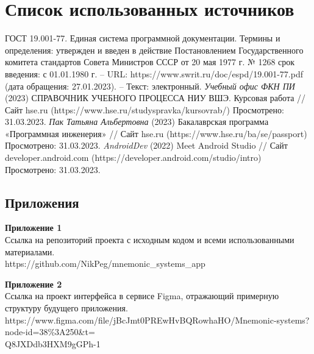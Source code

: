 \documentclass[draft]{article}
\newcommand\zz[1]{\par{\normalsize\strut #1} \hfill\ignorespaces}
\begin{document}
\section*{Список использованных источников}
\begin{thebibliography}{}
 ГОСТ 19.001-77. Единая система программной документации. Термины и определения: утвержден и введен в действие Постановлением Государственного комитета стандартов Совета Министров СССР от 20 мая 1977 г. № 1268 срок введения: с 01.01.1980 г. – URL: https://www.swrit.ru/doc/espd/19.001-77.pdf (дата обращения: 27.01.2023). – Текст: электронный.
 \textit{Учебный офис ФКН ПИ} (2023) СПРАВОЧНИК УЧЕБНОГО ПРОЦЕССА НИУ ВШЭ. Курсовая работа // Сайт hse.ru (https://www.hse.ru/studyspravka/kursovrab/) Просмотрено: 31.03.2023.
 \textit{Пак Татьяна Альбертовна} (2023) Бакалаврская программа «Программная инженерия» // Сайт hse.ru (https://www.hse.ru/ba/se/passport) Просмотрено: 31.03.2023.
 \textit{AndroidDev} (2022) Meet Android Studio // Сайт developer.android.com (https://developer.android.com/studio/intro) Просмотрено: 31.03.2023.
\end{thebibliography}
\newpage
\begin{center}
\section*{Приложения}
\end{center}
\zz{}\textbf{Приложение 1\\}
Ссылка на репозиторий проекта с исходным кодом и всеми использованными материалами.\\
https://github.com/NikPeg/mnemonic\_systems\_app\\
\zz{}\textbf{Приложение 2\\}
Ссылка на проект интерфейса в сервисе Figma, отражающий примерную структуру будущего приложения.\\
https://www.figma.com/file/jBcJmt0PREwHvBQRowhaHO/Mnemonic-systems?node-id=38\%3A250\&t=\\
Q8JXDdb3HXM9gGPh-1\\
\end{document}
